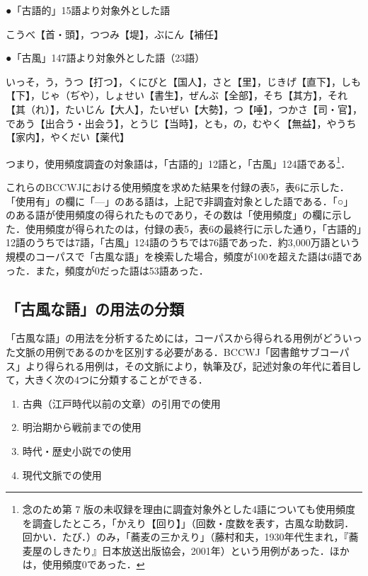 \documentclass[japanese]{jnlp_1.4}
\begin{document}
{\setlength{\leftskip}{1zw}\setlength{\parindent}{0pt}
●「古語的」15語より対象外とした語

こうべ【首・頭】，つつみ【堤】，ぶにん【補任】

●「古風」147語より対象外とした語（23語）

いっそ，う，うつ【打つ】，くにびと【国人】，さと【里】，じきげ【直下】，しも【下】，じゃ（ぢや），しょせい【書生】，ぜんぶ【全部】，そち【其方】，それ【其（れ）】，たいじん【大人】，たいぜい【大勢】，つ【唾】，つかさ【司・官】，であう【出合う・出会う】，とうじ【当時】，とも，の，むやく【無益】，やうち【家内】，やくだい【薬代】
\par}

つまり，使用頻度調査の対象語は，「古語的」12語と，「古風」124語である\footnote{念のため第 7 版の未収録を理由に調査対象外とした4語についても使用頻度を調査したところ，「かえり【回り】」（回数・度数を表す，古風な助数詞．回かい．たび．）のみ，「蕎麦の三かえり」（藤村和夫，1930年代生まれ，『蕎麦屋のしきたり』日本放送出版協会，2001年）という用例があった．ほかは，使用頻度0であった．}．

これらのBCCWJにおける使用頻度を求めた結果を付録の表5，表6に示した．「使用有」の欄に「—」のある語は，上記で非調査対象とした語である．「○」のある語が使用頻度の得られたものであり，その数は「使用頻度」の欄に示した．使用頻度が得られたのは，付録の表5，表6の最終行に示した通り，「古語的」12語のうちでは7語，「古風」124語のうちでは76語であった．約3,000万語という規模のコーパスで「古風な語」を検索した場合，頻度が100を超えた語は6語であった．また，頻度が0だった語は53語あった．


\subsection{「古風な語」の用法の分類}

「古風な語」の用法を分析するためには，コーパスから得られる用例がどういった文脈の用例であるのかを区別する必要がある．BCCWJ「図書館サブコーパス」より得られる用例は，その文脈により，執筆及び，記述対象の年代に着目して，大きく次の4つに分類することができる．

\begin{enumerate}
\item 
古典（江戸時代以前の文章）の引用での使用

\item 
明治期から戦前までの使用

\item 
時代・歴史小説での使用

\item 
現代文脈での使用
\end{enumerate}
\end{document}
